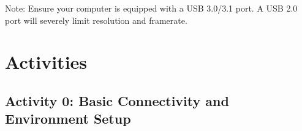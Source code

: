 \documentclass{article}
\begin{document}


\noindent Note: Ensure your computer is equipped with a USB 3.0/3.1 port. A USB 2.0 port will severely limit resolution and framerate.


\section{Activities}




\subsection*{Activity 0: Basic Connectivity and Environment Setup}
\end{document}
